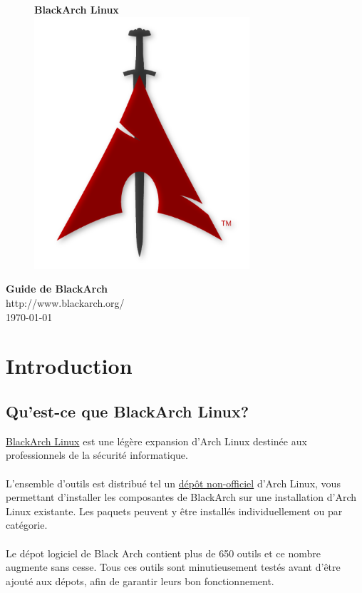 \documentclass[a4paper, oneside, 11pt]{book}
\begin{document}
\pagestyle{empty}
\begin{center}
\begin{figure}[htbp]
\centering
\vspace{1cm}
\Huge{\textbf{BlackArch \color{red}Linux}}\\
\vspace{2cm}
\includegraphics[width=8cm]{images/logo.png}
\label{fig:logo}
\end{figure}
\vspace{1cm}
\Huge{\textbf{Guide de BlackArch}}\\
\vspace{1cm}
\Large{\color{red}http://www.blackarch.org/}\\
\vspace{0.5cm}
\Large{\today}
\end{center}
\newpage
\tableofcontents
\newpage
\pagestyle{fancy}


\chapter{Introduction}

\section{Qu'est-ce que BlackArch Linux?}
\href{http://www.blackarch.org}{BlackArch Linux} est une légère expansion d'Arch
Linux destinée aux professionnels de la sécurité informatique.
\\\\
L'ensemble d'outils est distribué tel un
\href{https://wiki.archlinux.org/index.php/Unofficial\_User\_Repositories}
{dépôt non-officiel} d'Arch Linux, vous permettant d'installer les composantes de
BlackArch sur une installation d'Arch Linux existante. Les paquets peuvent y être
installés individuellement ou par catégorie.
\\\\
Le dépot logiciel de Black Arch contient plus de 650 outils et ce nombre augmente
sans cesse. Tous ces outils sont minutieusement testés avant d'être ajouté aux
dépots, afin de garantir leurs bon fonctionnement.
\end{document}
